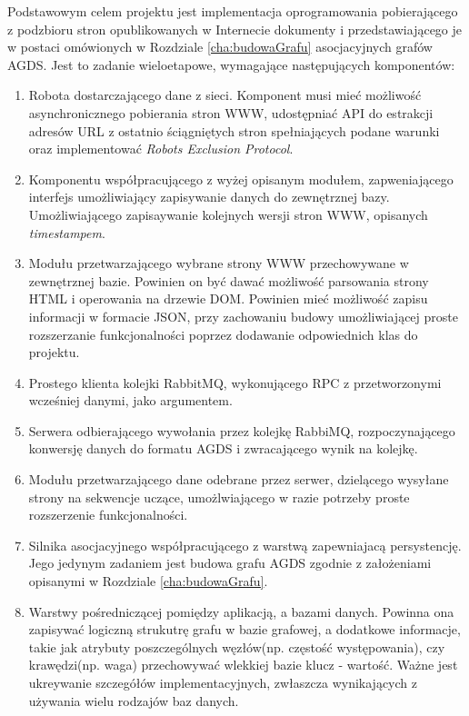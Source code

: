 Podstawowym celem projektu jest implementacja oprogramowania pobierającego z podzbioru stron opublikowanych w Internecie dokumenty i przedstawiającego
je w postaci omówionych w Rozdziale \ref{cha:budowaGrafu} asocjacyjnych grafów AGDS. Jest to zadanie wieloetapowe, wymagające następujących komponentów:
\begin{enumerate}
\item Robota dostarczającego dane z sieci. Komponent musi mieć możliwość asynchronicznego pobierania stron WWW, udostępniać API do estrakcji adresów URL z ostatnio
ściągniętych stron spełniających podane warunki oraz implementować \emph{Robots Exclusion Protocol}.
\item Komponentu współpracującego z wyżej opisanym modułem, zapweniającego interfejs umożliwiający zapisywanie danych do zewnętrznej bazy. Umożliwiającego
zapisaywanie kolejnych wersji stron WWW, opisanych \emph{timestampem}.
\item Modułu przetwarzającego wybrane strony WWW przechowywane w zewnętrznej bazie. Powinien on być dawać możliwość parsowania strony HTML i operowania na drzewie DOM.
Powinien mieć możliwość zapisu informacji w formacie JSON, przy zachowaniu budowy umożliwiającej proste rozszerzanie funkcjonalności poprzez dodawanie odpowiednich klas do projektu.
\item Prostego klienta kolejki RabbitMQ, wykonującego RPC z przetworzonymi wcześniej danymi, jako argumentem.
\item Serwera odbierającego wywołania przez kolejkę RabbiMQ, rozpoczynającego konwersję danych do formatu AGDS i zwracającego wynik na kolejkę.
\item Modułu przetwarzającego dane odebrane przez serwer, dzielącego wysyłane strony na sekwencje uczące, umożlwiającego w razie potrzeby proste rozszerzenie funkcjonalności.
\item Silnika asocjacyjnego współpracującego z warstwą zapewniajacą persystencję. Jego jedynym zadaniem jest budowa grafu AGDS zgodnie z założeniami opisanymi w Rozdziale
\ref{cha:budowaGrafu}.
\item Warstwy pośredniczącej pomiędzy aplikacją, a bazami danych. Powinna ona zapisywać logiczną strukutrę grafu w bazie grafowej, a dodatkowe informacje, takie jak
atrybuty poszczególnych węzłów(np. częstość występowania), czy krawędzi(np. waga) przechowywać wlekkiej bazie klucz - wartość. Ważne jest ukreywanie szczegółów implementacyjnych,
zwłaszcza wynikających z używania wielu rodzajów baz danych.
\end{enumerate}

